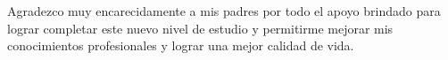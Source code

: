 
Agradezco muy encarecidamente a mis padres por todo el apoyo brindado para lograr completar este nuevo nivel de estudio y permitirme mejorar mis conocimientos profesionales y lograr una mejor calidad de vida. 
